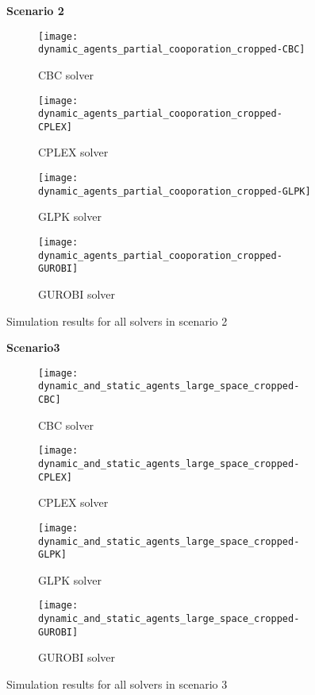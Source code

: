 \begin{figure}[H]
    \centering
    \textbf{Scenario 2}\par \medskip
    \begin{subfigure}{0.49\textwidth}
        \centering
        \texttt{[image: dynamic\_agents\_partial\_cooporation\_cropped-CBC]}
        \caption{CBC solver}
    \end{subfigure}
    \begin{subfigure}{0.49\textwidth}
        \centering
        \texttt{[image: dynamic\_agents\_partial\_cooporation\_cropped-CPLEX]}
        \caption{CPLEX solver}
    \end{subfigure}
    \begin{subfigure}{0.49\textwidth}
        \centering
        \texttt{[image: dynamic\_agents\_partial\_cooporation\_cropped-GLPK]}
        \caption{GLPK solver}
    \end{subfigure}
    \begin{subfigure}{0.49\textwidth}
        \centering
        \texttt{[image: dynamic\_agents\_partial\_cooporation\_cropped-GUROBI]}
        \caption{GUROBI solver}
    \end{subfigure}
    \caption{Simulation results for all solvers in scenario 2}
	\label{fig:dynamic_agents_partial_cooperation_cropped}
\end{figure}

\begin{figure}[H]
    \centering
    \textbf{Scenario3}\par \medskip
    \begin{subfigure}{0.49\textwidth}
        \centering
        \texttt{[image: dynamic\_and\_static\_agents\_large\_space\_cropped-CBC]}
        \caption{CBC solver}
    \end{subfigure}
    \begin{subfigure}{0.49\textwidth}
        \centering
        \texttt{[image: dynamic\_and\_static\_agents\_large\_space\_cropped-CPLEX]}
        \caption{CPLEX solver}
    \end{subfigure}
    \begin{subfigure}{0.49\textwidth}
        \centering
        \texttt{[image: dynamic\_and\_static\_agents\_large\_space\_cropped-GLPK]}
        \caption{GLPK solver}
    \end{subfigure}
    \begin{subfigure}{0.49\textwidth}
        \centering
        \texttt{[image: dynamic\_and\_static\_agents\_large\_space\_cropped-GUROBI]}
        \caption{GUROBI solver}
    \end{subfigure}
    \caption{Simulation results for all solvers in scenario 3}
	\label{fig:dynamic_and_static_agents_large_space_cropped}
\end{figure}

